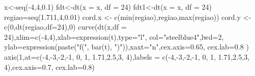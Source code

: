 \documentclass[
  letterpaper,
  DIV=11,
  numbers=noendperiod]{scrartcl}
\newenvironment{Shaded}{\begin{snugshade}}{\end{snugshade}}
\newcommand{\AttributeTok}[1]{\textcolor[rgb]{0.40,0.45,0.13}{#1}}
\newcommand{\DecValTok}[1]{\textcolor[rgb]{0.68,0.00,0.00}{#1}}
\newcommand{\FloatTok}[1]{\textcolor[rgb]{0.68,0.00,0.00}{#1}}
\newcommand{\FunctionTok}[1]{\textcolor[rgb]{0.28,0.35,0.67}{#1}}
\newcommand{\NormalTok}[1]{\textcolor[rgb]{0.00,0.23,0.31}{#1}}
\newcommand{\OtherTok}[1]{\textcolor[rgb]{0.00,0.23,0.31}{#1}}
\newcommand{\SpecialCharTok}[1]{\textcolor[rgb]{0.37,0.37,0.37}{#1}}
\newcommand{\StringTok}[1]{\textcolor[rgb]{0.13,0.47,0.30}{#1}}
\begin{document}
\vspace{0.5cm}

\begin{Shaded}
\begin{Highlighting}[]
\NormalTok{x}\OtherTok{\textless{}{-}}\FunctionTok{seq}\NormalTok{(}\SpecialCharTok{{-}}\DecValTok{4}\NormalTok{,}\DecValTok{4}\NormalTok{,}\FloatTok{0.1}\NormalTok{) }
\NormalTok{fdt}\OtherTok{\textless{}{-}}\FunctionTok{dt}\NormalTok{(}\AttributeTok{x =}\NormalTok{ x, }\AttributeTok{df =} \DecValTok{24}\NormalTok{)  }
\NormalTok{fdt1}\OtherTok{\textless{}{-}}\FunctionTok{dt}\NormalTok{(}\AttributeTok{x =}\NormalTok{ x, }\AttributeTok{df =} \DecValTok{24}\NormalTok{)}
\NormalTok{regiao}\OtherTok{=}\FunctionTok{seq}\NormalTok{(}\FloatTok{1.711}\NormalTok{,}\DecValTok{4}\NormalTok{,}\FloatTok{0.01}\NormalTok{)}
\NormalTok{cord.x }\OtherTok{\textless{}{-}} \FunctionTok{c}\NormalTok{(}\FunctionTok{min}\NormalTok{(regiao),regiao,}\FunctionTok{max}\NormalTok{(regiao))}
\NormalTok{cord.y }\OtherTok{\textless{}{-}} \FunctionTok{c}\NormalTok{(}\DecValTok{0}\NormalTok{,}\FunctionTok{dt}\NormalTok{(regiao,}\AttributeTok{df=}\DecValTok{24}\NormalTok{),}\DecValTok{0}\NormalTok{) }
\FunctionTok{curve}\NormalTok{(}\FunctionTok{dt}\NormalTok{(x,}\AttributeTok{df =} \DecValTok{24}\NormalTok{),}\AttributeTok{xlim=}\FunctionTok{c}\NormalTok{(}\SpecialCharTok{{-}}\DecValTok{4}\NormalTok{,}\DecValTok{4}\NormalTok{),}\AttributeTok{xlab=}\FunctionTok{expression}\NormalTok{(t),}\AttributeTok{type=}\StringTok{"l"}\NormalTok{,}
      \AttributeTok{col=}\StringTok{"steelblue4"}\NormalTok{,}\AttributeTok{lwd=}\DecValTok{2}\NormalTok{, }\AttributeTok{ylab=}\FunctionTok{expression}\NormalTok{(}\FunctionTok{paste}\NormalTok{(}\StringTok{"f("}\NormalTok{, }\FunctionTok{bar}\NormalTok{(t),}
      \StringTok{")"}\NormalTok{)),}\AttributeTok{xaxt=}\StringTok{"n"}\NormalTok{,}\AttributeTok{cex.axis=}\FloatTok{0.65}\NormalTok{, }\AttributeTok{cex.lab=}\FloatTok{0.8}\NormalTok{ ) }
\FunctionTok{axis}\NormalTok{(}\DecValTok{1}\NormalTok{,}\AttributeTok{at=}\FunctionTok{c}\NormalTok{(}\SpecialCharTok{{-}}\DecValTok{4}\NormalTok{,}\SpecialCharTok{{-}}\DecValTok{3}\NormalTok{,}\SpecialCharTok{{-}}\DecValTok{2}\NormalTok{,}\SpecialCharTok{{-}}\DecValTok{1}\NormalTok{, }\DecValTok{0}\NormalTok{, }\DecValTok{1}\NormalTok{, }\FloatTok{1.71}\NormalTok{,}\FloatTok{2.5}\NormalTok{,}\DecValTok{3}\NormalTok{, }\DecValTok{4}\NormalTok{),}\AttributeTok{labels =}
       \FunctionTok{c}\NormalTok{(}\SpecialCharTok{{-}}\DecValTok{4}\NormalTok{,}\SpecialCharTok{{-}}\DecValTok{3}\NormalTok{,}\SpecialCharTok{{-}}\DecValTok{2}\NormalTok{,}\SpecialCharTok{{-}}\DecValTok{1}\NormalTok{, }\DecValTok{0}\NormalTok{, }\DecValTok{1}\NormalTok{, }\FloatTok{1.71}\NormalTok{,}\FloatTok{2.5}\NormalTok{,}\DecValTok{3}\NormalTok{, }\DecValTok{4}\NormalTok{),}\AttributeTok{cex.axis=}\FloatTok{0.7}\NormalTok{, }\AttributeTok{cex.lab=}\FloatTok{0.8}\NormalTok{) }

\end{Highlighting}
\end{Shaded}
\end{document}
